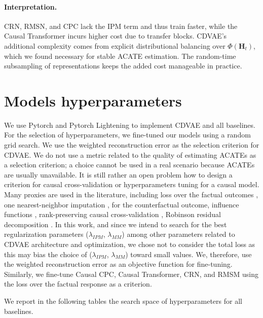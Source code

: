 \documentclass[10pt]{article} %
\begin{document}
\paragraph{Interpretation.}
CRN, RMSN, and CPC lack the IPM term and thus train faster, while the Causal Transformer incurs higher cost due to transfer blocks. CDVAE’s additional complexity comes from explicit distributional balancing over $\Phi(\mathbf{H}_t)$, which we found necessary for stable ACATE estimation. The random-time subsampling of representations keeps the added cost manageable in practice.

\section{Models hyperparameters}
\label{sect:hyperparams_details}
We use Pytorch \citep{Paszke2019PyTorchAI} and Pytorch Lightening \citep{Falcon_PyTorch_Lightning_2019} to implement CDVAE and all baselines. For the selection of hyperparameters, we fine-tuned our models using a random grid search. We use the weighted reconstruction error as the selection criterion for CDVAE. We do not use a metric related to the quality of estimating ACATEs as a selection criterion; a choice cannot be used in a real scenario because ACATEs are usually unavailable. It is still rather an open problem how to design a criterion for causal cross-validation or hyperparameters tuning for a causal model. Many proxies are used in the literature, including loss over the factual outcomes \citep{lim2018RMSM, hassanpour2019DRLCFR, bica2020estimatingCRN, Bica2020TimeSDecounf}, one nearest-neighbor imputation \citep{shalit2017estimating, johansson2022generalization}, for the counterfactual outcome, inﬂuence functions \citep{alaa2019validating}, rank-preserving causal cross-validation \citep{schuler2018comparison}, Robinson residual decomposition \citep{nie2021quasi,lu2020reconsidering}. In this work, and since we intend to search for the best regularization parameters ($\lambda_{IPM}$, $\lambda_{MM}$) among other parameters related to CDVAE architecture and optimization, we chose not to consider the total loss as this may bias the choice of ($\lambda_{IPM}$, $\lambda_{MM}$) toward small values. We, therefore, use the weighted reconstruction error as an objective function for fine-tuning. Similarly, we fine-tune Causal CPC, Causal Transformer, CRN, and RMSM using the loss over the factual response as a criterion. 

We report in the following tables the search space of hyperparameters for all baselines.
\end{document}
